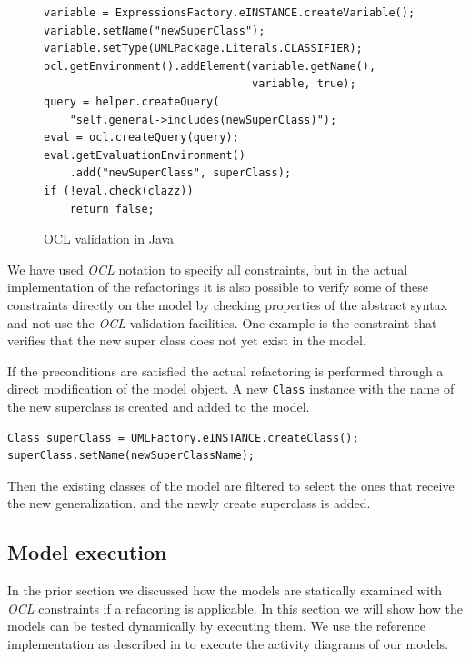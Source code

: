 \documentclass{llncs}
\begin{document}
\begin{figure}
\begin{lstlisting}
variable = ExpressionsFactory.eINSTANCE.createVariable();
variable.setName("newSuperClass");
variable.setType(UMLPackage.Literals.CLASSIFIER);
ocl.getEnvironment().addElement(variable.getName(),
                                variable, true);
query = helper.createQuery(
    "self.general->includes(newSuperClass)");
eval = ocl.createQuery(query);
eval.getEvaluationEnvironment()
    .add("newSuperClass", superClass);
if (!eval.check(clazz))
    return false;
\end{lstlisting}
\caption{OCL validation in Java}
\label{lst:ocl}
\end{figure}

We have used \textit{OCL} notation to specify all constraints, but in the actual implementation of the refactorings it
is also possible to verify some of these constraints directly on the model by checking properties of the abstract syntax
and not use the \textit{OCL} validation facilities. One example is the constraint that verifies that the new super class does not
yet exist in the model.

If the preconditions are satisfied the actual refactoring is performed through a direct modification of the model object.
A new \lstinline|Class| instance with the name of the new superclass is created and added to the model. 

\begin{lstlisting}
Class superClass = UMLFactory.eINSTANCE.createClass();
superClass.setName(newSuperClassName);
\end{lstlisting}


Then the existing
classes of the model are filtered to select the ones that receive the new generalization, and the newly create superclass
is added.

\subsection{Model execution}
\label{sec:execution}
In the prior section we discussed how the models are statically examined with \textit{OCL} constraints if a refacoring 
is applicable. In this section we will show how the models can be tested dynamically by executing them. We use the 
reference implementation as described in \cite{DBLP:conf/models/MayerhoferLK12} to execute the activity diagrams of 
our models.
\end{document}
